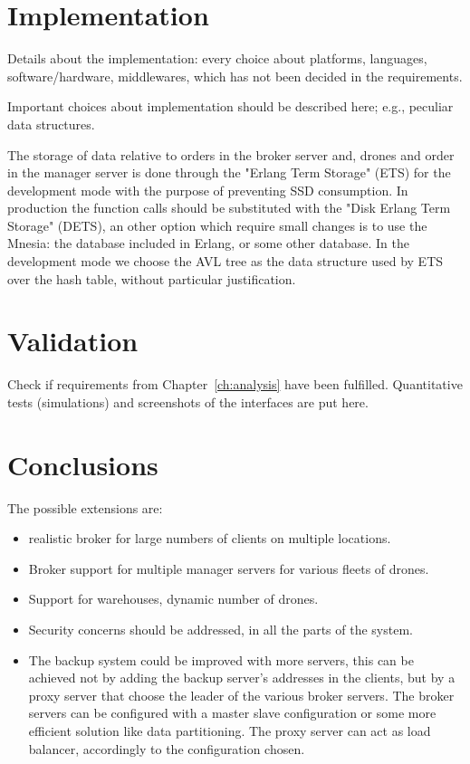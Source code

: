 \documentclass[a4paper, oneside]{memoir}
\begin{document}
\chapter{Implementation}

Details about the implementation: every choice about platforms, languages, software/hardware, middlewares, which has not been decided in the requirements.


Important choices about implementation should be described here; e.g., peculiar data structures.

The storage of data relative to orders in the broker server and, drones and order in the manager server is done through the "Erlang Term Storage" (ETS) for the development mode with the purpose of preventing SSD consumption. In production the function calls should be substituted with the "Disk Erlang Term Storage" (DETS), an other option which require small changes is to use the Mnesia: the database included in Erlang, or some other database. In the development mode we choose the AVL tree as the data structure used by ETS over the hash table, without particular justification.

\chapter{Validation}

Check if requirements from Chapter~\ref{ch:analysis} have been fulfilled.
Quantitative tests (simulations) and screenshots of the interfaces are put here.


\chapter{Conclusions}

The possible extensions are:
\begin{itemize}
	\item realistic broker for large numbers of clients on multiple locations.
	\item Broker support for multiple manager servers for various fleets of drones.
	\item Support for warehouses, dynamic number of drones.
	\item Security concerns should be addressed, in all the parts of the system.
	\item The backup system could be improved with more servers, this can be achieved not by adding the backup server's addresses in the clients, but by a proxy server that choose the leader of the various broker servers. The broker servers can be configured with a master slave configuration or some more efficient solution like data partitioning. The proxy server can act as load balancer, accordingly to the configuration chosen.
\end{itemize}
\end{document}
